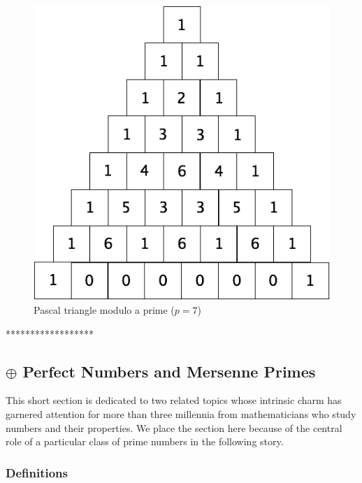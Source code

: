 {\begin{figure}[ht]
\begin{center}
        \includegraphics[scale=0.3]{FiguresArithmetic/TrianglePascalModulo7.png}
        \caption{Pascal triangle modulo a prime ($p=7$)}
        \label{fig:TriangleModulo7}
\end{center}
\end{figure}
******************}


\subsection{$\oplus$  Perfect Numbers and Mersenne Primes}
\label{sec:perfect-numbers+Mersenne-primes}

This short section is dedicated to two related topics whose intrinsic charm has garnered attention for more than three millennia from mathematicians who study numbers and their properties.  We place the section here because of the central role of a particular class of prime numbers in the following story.

\subsubsection{Definitions}
\label{sec:perfect-numbers}
\label{sec:Mersenne-primes}

